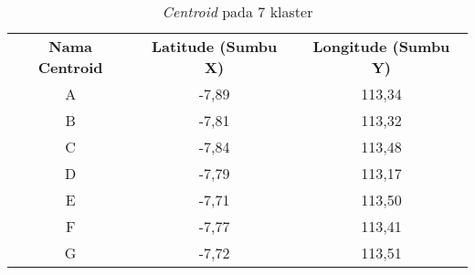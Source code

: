 \begin{table}[H]
\footnotesize
\centering
\begin{tabular}{ccc}
\rowcolor[HTML]{4472C4} 
{\color[HTML]{FFFFFF} \textbf{Nama   Centroid}} & {\color[HTML]{FFFFFF} \textbf{Latitude (Sumbu X)}} & {\color[HTML]{FFFFFF} \textbf{Longitude (Sumbu Y)}} \\
\rowcolor[HTML]{D9E1F2} 
A & -7,89 & 113,34 \\
B & -7,81 & 113,32 \\
\rowcolor[HTML]{D9E1F2} 
C & -7,84 & 113,48 \\
D & -7,79 & 113,17 \\
\rowcolor[HTML]{D9E1F2} 
E & -7,71 & 113,50 \\
F & -7,77 & 113,41 \\
\rowcolor[HTML]{D9E1F2} 
G & -7,72 & 113,51
\end{tabular}
\caption{\textit{Centroid} pada 7 klaster}
\label{tab:center7}
\end{table}